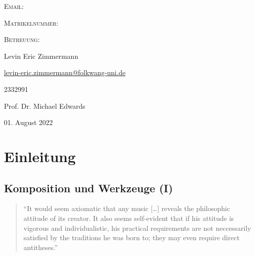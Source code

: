 \documentclass[12pt,a4paper,ngerman]{article}
\newcommand{\mailto}[1]{\href{mailto:#1}{#1}}
\begin{document}
\begin{titlepage}
\begin{minipage}[b]{.25\textwidth}
\begin{flushleft}
\textsc{Email:}

\textsc{Matrikelnummer:}

\textsc{Betreuung:}
\end{flushleft}
\end{minipage}%
\begin{minipage}[b]{.5\textwidth}
\begin{flushleft}
Levin Eric Zimmermann %

{\normalsize \mailto{levin-eric.zimmermann@folkwang-uni.de}}

2332991

Prof. Dr. Michael Edwards
\end{flushleft}
\end{minipage}

\vspace{2cm}



{\large 01. August 2022}\\[2cm] %

\vfill %

\end{titlepage}

\newpage


\tableofcontents


\newpage


\section{Einleitung}

\subsection{Komposition und Werkzeuge (I)}

\begin{quote}
    ``It would seem axiomatic that any music [\dots] reveals the philosophic attitude of its creator.
    It also seems self-evident that if his attitude is vigorous and individualistic, his practical requirements are not neccessarily satisfied by the traditions he was born to;
    they may even require direct antitheses.''~\parencite[S. 3]{genesisOfMusic}
\end{quote}
\end{document}
